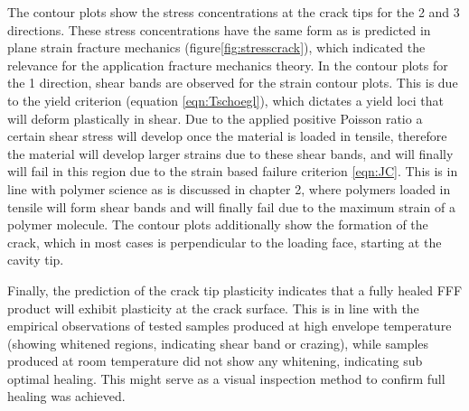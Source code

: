 The contour plots show the stress concentrations at the crack tips for the 2 and 3 directions. These stress concentrations have the same form as is predicted in plane strain fracture mechanics (figure\ref{fig:stresscrack}), which indicated the relevance for the application fracture mechanics theory. In the contour plots for the 1 direction, shear bands are observed for the strain contour plots. This is due to the yield criterion (equation \ref{eqn:Tschoegl}), which dictates a yield loci that will deform plastically in shear. Due to the applied positive Poisson ratio a certain shear stress will develop once the material is loaded in tensile, therefore the material will develop larger strains due to these shear bands, and will finally will fail in this region due to the strain based failure criterion \ref{eqn:JC}. This is in line with polymer science as is discussed in chapter 2, where polymers loaded in tensile will form shear bands and will finally fail due to the maximum strain of a polymer molecule. The contour plots additionally show the formation of the crack, which in most cases is perpendicular to the loading face, starting at the cavity tip. 

Finally, the prediction of the crack tip plasticity indicates that a fully healed FFF product will exhibit plasticity at the crack surface. This is in line with the empirical observations of tested samples produced at high envelope temperature (showing whitened regions, indicating shear band or crazing), while samples produced at room temperature did not show any whitening, indicating sub optimal healing. This might serve as a visual inspection method to confirm full healing was achieved. 
%



